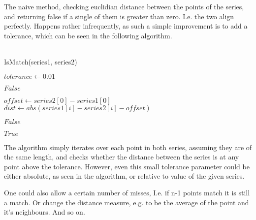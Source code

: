 \documentclass[../../main.tex]{subfiles}
\begin{document}
The naive method, checking euclidian distance between the points of the series, and returning false if a single of them is greater than zero. I.e. the two align perfectly. Happens rather infrequently, as such a simple improvement is to add a tolerance, which can be seen in the following algorithm.\\\\

\begin{algorithm}
\caption{IsMatch(series1, series2)}
\begin{algorithmic}
\Require $tolerance \gets 0.01$ 

	\Return $False$
	
\EndIf

\State $offset \gets series2[0] - series1[0]$
	\State $dist \gets abs( series1[i] - series2[i] - offset )$
	
		\Return $False$
		
	\EndIf
\EndFor

\Return $True$
\end{algorithmic}
\end{algorithm}

The algorithm simply iterates over each point in both series, assuming they are of the same length, and checks whether the distance between the series is at any point above the tolerance. However, even this small tolerance parameter could be either absolute, as seen in the algorithm, or relative to value of the given series.

One could also allow a certain number of misses, I.e. if n-1 points match it is still a match. Or change the distance measure, e.g. to be the average of the point and it's neighbours. And so on.
\end{document}
